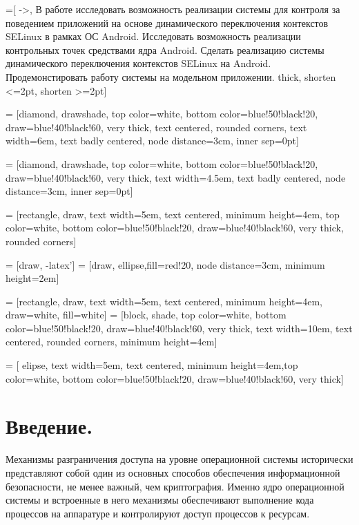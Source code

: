  =[ ->,
В работе исследовать возможность реализации системы для контроля за
поведением приложений на основе
динамического переключения контекстов SELinux в рамках ОС Android.
Исследовать возможность реализации контрольных точек средствами ядра
Android. Сделать реализацию системы динамического переключения
контекстов SELinux на Android. Продемонстировать работу системы на модельном
приложении.
	thick,
	shorten <=2pt,
	shorten >=2pt]

 = [diamond, drawshade, top color=white,
    bottom color=blue!50!black!20, draw=blue!40!black!60, very
    thick, text centered, rounded corners, text width=6em, text badly centered, node distance=3cm, inner sep=0pt]

  = [diamond, drawshade,  top color=white,
    bottom color=blue!50!black!20, draw=blue!40!black!60, very
    thick, text width=4.5em, text badly centered, node distance=3cm, inner sep=0pt]

  = [rectangle, draw,  text width=5em, text centered, minimum height=4em, top color=white,  bottom color=blue!50!black!20, draw=blue!40!black!60, very thick, rounded corners]

 = [draw, -latex']
 = [draw, ellipse,fill=red!20, node distance=3cm,
    minimum height=2em]
   
 = [rectangle, draw,  text width=5em, text centered, minimum height=4em, draw=white, fill=white]
 = [block, shade, top color=white,
    bottom color=blue!50!black!20, draw=blue!40!black!60, very
    thick, text width=10em, text centered, rounded corners, minimum height=4em]

 = [ elipse, text width=5em, text centered, minimum height=4em,top color=white,
    bottom color=blue!50!black!20, draw=blue!40!black!60, very thick]

\bigskip 
\section{Введение.}

Механизмы разграничения доступа на уровне операционной
системы исторически представляют собой один из основных способов
обеспечения информационной безопасности, не менее
важный, чем криптография. Именно ядро операционной системы
и встроенные в него механизмы обеспечивают выполнение
кода процессов на аппаратуре и контролируют доступ
процессов к ресурсам.


